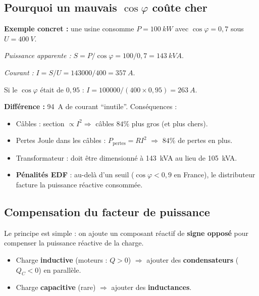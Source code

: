 \documentclass[12pt,a4paper,twoside]{book}
\begin{document}
\subsection{Pourquoi un mauvais $\cos\varphi$ coûte cher}

\begin{pratique}
\textbf{Exemple concret :} une usine consomme $P = \SI{100}{kW}$ avec $\cos\varphi = 0{,}7$ sous $U = \SI{400}{V}$.

\textit{Puissance apparente :} $S = P/\cos\varphi = 100/0{,}7 = \SI{143}{kVA}$.

\textit{Courant :} $I = S/U = 143000/400 = \SI{357}{A}$.

Si le $\cos\varphi$ était de $0{,}95$ : $I = 100000/(400\times0{,}95) = \SI{263}{A}$.

\textbf{Différence :} \SI{94}{A} de courant ``inutile''. Conséquences :
\begin{itemize}[nosep]
\item Câbles : section $\propto I^2 \Rightarrow$ câbles $84\%$ plus gros (et plus chers).
\item Pertes Joule dans les câbles : $P_{\text{pertes}} = RI^2$ $\Rightarrow$ $84\%$ de pertes en plus.
\item Transformateur : doit être dimensionné à \SI{143}{kVA} au lieu de \SI{105}{kVA}.
\item \textbf{Pénalités EDF} : au-delà d'un seuil ($\cos\varphi < 0{,}9$ en France), le distributeur facture la puissance réactive consommée.
\end{itemize}
\end{pratique}

\subsection{Compensation du facteur de puissance}

Le principe est simple : on ajoute un composant réactif de \textbf{signe opposé} pour compenser la puissance réactive de la charge.

\begin{itemize}[nosep]
\item Charge \textbf{inductive} (moteurs : $Q > 0$) $\Rightarrow$ ajouter des \textbf{condensateurs} ($Q_C < 0$) en parallèle.
\item Charge \textbf{capacitive} (rare) $\Rightarrow$ ajouter des \textbf{inductances}.
\end{itemize}
\end{document}
